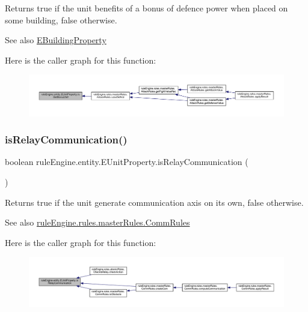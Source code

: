 \begin{DoxyReturn}{Returns}
true if the unit benefits of a bonus of defence power when placed on some building, false otherwise. 
\end{DoxyReturn}
\begin{DoxySeeAlso}{See also}
\mbox{\hyperlink{enumrule_engine_1_1entity_1_1_e_building_property}{E\+Building\+Property}} 
\end{DoxySeeAlso}
Here is the caller graph for this function\+:
\nopagebreak
\begin{figure}[H]
\begin{center}
\leavevmode
\includegraphics[width=350pt]{enumrule_engine_1_1entity_1_1_e_unit_property_a4fe027f48fdcd08c55769992e4ad9f3d_icgraph}
\end{center}
\end{figure}
\mbox{\label{enumrule_engine_1_1entity_1_1_e_unit_property_aaa8acb0feaca250d0d32e4c954d20535}} 
\subsubsection{\texorpdfstring{is\+Relay\+Communication()}{isRelayCommunication()}}
{\footnotesize\ttfamily boolean rule\+Engine.\+entity.\+E\+Unit\+Property.\+is\+Relay\+Communication (\begin{DoxyParamCaption}{ }\end{DoxyParamCaption})\hspace{0.3cm}{\ttfamily [inline]}}

\begin{DoxyReturn}{Returns}
true if the unit generate communication axis on its own, false otherwise. 
\end{DoxyReturn}
\begin{DoxySeeAlso}{See also}
\mbox{\hyperlink{classrule_engine_1_1rules_1_1master_rules_1_1_comm_rules}{rule\+Engine.\+rules.\+master\+Rules.\+Comm\+Rules}} 
\end{DoxySeeAlso}
Here is the caller graph for this function\+:
\nopagebreak
\begin{figure}[H]
\begin{center}
\leavevmode
\includegraphics[width=350pt]{enumrule_engine_1_1entity_1_1_e_unit_property_aaa8acb0feaca250d0d32e4c954d20535_icgraph}
\end{center}
\end{figure}


